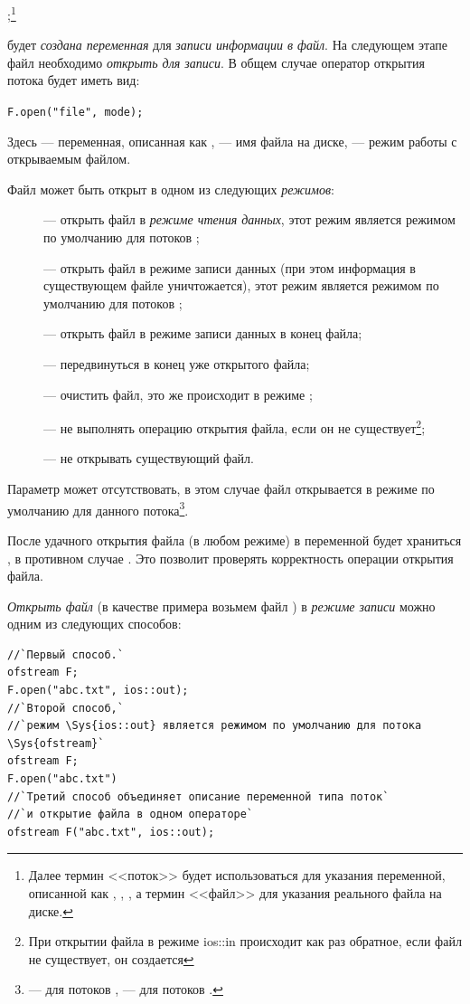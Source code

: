 ;\footnote{Далее термин <<поток>> будет использоваться для указания переменной,
описанной как , , , а термин <<файл>> для указания реального файла на диске.}

будет \emph{создана переменная}  для \emph{записи
информации в файл}. На следующем этапе файл необходимо
\emph{открыть для записи}. В общем случае оператор открытия потока
будет иметь вид:

\lstinline!F.open("file", mode);!

Здесь  --- переменная, описанная как ,  --- имя файла
на диске,  --- режим работы с открываемым файлом. 

Файл может быть открыт в одном из следующих \emph{режимов}:
\begin{description}
\item[] --- открыть файл в \emph{режиме чтения данных}, этот режим является режимом по
умолчанию для потоков ;
\item[] --- открыть файл в режиме записи данных (при этом информация в существующем файле
уничтожается), этот режим является режимом по умолчанию для потоков ;
\item[] --- открыть файл в режиме записи данных в конец файла;
\item[] --- передвинуться в конец уже открытого файла;
\item[] --- очистить файл, это же происходит в режиме ;
\item[] --- не выполнять операцию открытия файла, если он не существует\footnote{При открытии
файла в режиме ios::in происходит как раз обратное, если файл не существует, он создается}; 
\item[] --- не открывать существующий файл.
\end{description}
Параметр  может отсутствовать, в этом случае файл открывается в режиме по умолчанию для данного
потока\footnote{ --- для потоков ,  --- для потоков .}.

После удачного открытия файла (в любом режиме) в переменной  будет храниться
, в противном случае . Это позволит проверять корректность операции
открытия файла.

\emph{Открыть файл} (в качестве примера возьмем файл ) в \emph{режиме
записи} можно одним из следующих способов:
\begin{lstlisting}
//`Первый способ.`
ofstream F;			
F.open("abc.txt", ios::out);
//`Второй способ,` 
//`режим \Sys{ios::out} является режимом по умолчанию для потока \Sys{ofstream}`
ofstream F; 
F.open("abc.txt")
//`Третий способ объединяет описание переменной типа поток` 
//`и открытие файла в одном операторе`
ofstream F("abc.txt", ios::out);
\end{lstlisting}


